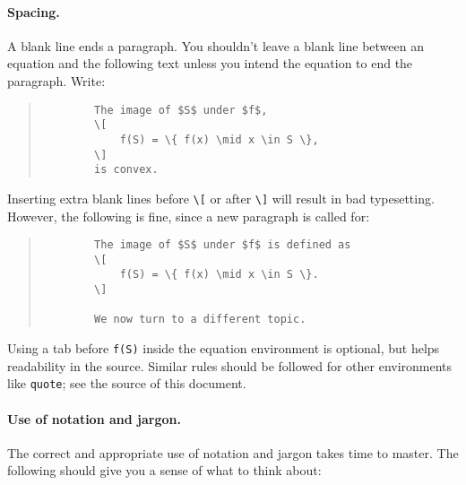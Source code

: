 \documentclass{article}
\begin{document}
\paragraph{Spacing.}
A blank line ends a paragraph. 
You shouldn't leave a blank line between an equation and the following text unless you intend the equation to end the paragraph. 
Write:
\begin{quote}
    \begin{verbatim}
        The image of $S$ under $f$,
        \[
            f(S) = \{ f(x) \mid x \in S \},
        \]
        is convex.
    \end{verbatim}
\end{quote}
Inserting extra blank lines before \verb+\[+ or after \verb+\]+ will result in bad typesetting. 
However, the following is fine, since a new paragraph is called for:
\begin{quote}
    \begin{verbatim}
        The image of $S$ under $f$ is defined as
        \[
            f(S) = \{ f(x) \mid x \in S \}.
        \]

        We now turn to a different topic.
    \end{verbatim}
\end{quote}
Using a tab before \verb+f(S)+ inside the equation environment is
optional, but helps readability in the source.  Similar rules should be
followed for other environments like \texttt{quote}; see the source of this
document.

\paragraph{Use of notation and jargon.}
The correct and appropriate use of notation and jargon takes time to master.
The following should give you a sense of what to think about:
\end{document}
